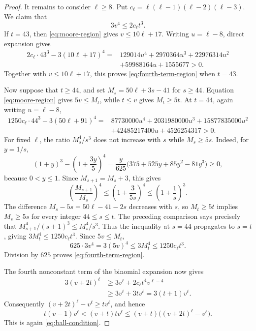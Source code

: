 \begin{proof}
It remains to consider \(\ell\ge8\).  Put
\(c_\ell=\ell(\ell-1)(\ell-2)(\ell-3)\).  We claim that
\begin{equation}\label{eq:fourth-term-region}
 3v^4\le2c_\ell t^3.
\end{equation}
If \(t=43\), then \eqref{eq:moore-region} gives
\(v\le10\ell+17\).  Writing \(u=\ell-8\), direct expansion gives
\begin{align*}
2c_\ell\cdot43^3-3(10\ell+17)^4
={}&129014u^4+2970364u^3+22976314u^2\\
 &+59988164u+1555677>0.
\end{align*}
Together with \(v\le10\ell+17\), this proves
\eqref{eq:fourth-term-region} when \(t=43\).

Now suppose that \(t\ge44\), and set \(M_s=50\ell+3s-41\) for \(s\ge44\).
Equation \eqref{eq:moore-region} gives \(5v\le M_t\), while
\(t\le v\) gives \(M_t\ge5t\).  At \(t=44\), again writing
\(u=\ell-8\),
\begin{align*}
1250c_\ell\cdot44^3-3(50\ell+91)^4
={}&87730000u^4+2031980000u^3+15877835000u^2\\
&+42485217400u+4526254317>0.
\end{align*}
For fixed \(\ell\), the ratio \(M_s^4/s^3\) does not increase with
\(s\) while \(M_s\ge5s\).  Indeed, for \(y=1/s\),
\[
 (1+y)^3-\left(1+\frac{3y}{5}\right)^4
 =\frac{y}{625}\bigl(375+525y+85y^2-81y^3\bigr)\ge0,
\]
because \(0<y\le1\).  Since \(M_{s+1}=M_s+3\), this gives
\[
 \left(\frac{M_{s+1}}{M_s}\right)^4
 \le\left(1+\frac{3}{5s}\right)^4
 \le\left(1+\frac1s\right)^3.
\]
The difference \(M_s-5s=50\ell-41-2s\) decreases with \(s\), so
\(M_t\ge5t\) implies \(M_s\ge5s\) for every integer \(44\le s\le t\).
The preceding comparison says precisely that
\(M_{s+1}^4/(s+1)^3\le M_s^4/s^3\).  Thus the inequality at \(s=44\)
propagates to \(s=t\), giving
\(3M_t^4\le1250c_\ell t^3\).  Since \(5v\le M_t\),
\[
 625\cdot3v^4=3(5v)^4\le3M_t^4\le1250c_\ell t^3.
\]
Division by \(625\) proves \eqref{eq:fourth-term-region}.

The fourth nonconstant term of the binomial expansion now gives
\[
\begin{aligned}
3(v+2t)^\ell
&\ge3v^\ell+2c_\ell t^4v^{\ell-4}\\
&\ge3v^\ell+3t v^\ell
 =3(t+1)v^\ell.
\end{aligned}
\]
Consequently
\((v+2t)^\ell-v^\ell\ge t v^\ell\), and hence
\[
 t(v-1)v^\ell<(v+t)t v^\ell
 \le(v+t)\bigl((v+2t)^\ell-v^\ell\bigr).
\]
This is again \eqref{eq:ball-condition}.
\end{proof}

